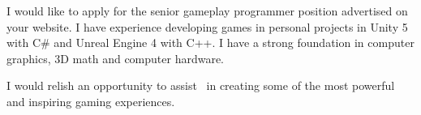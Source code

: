 I would like to apply for the senior gameplay programmer position advertised on your website.
I have experience developing games in personal projects in Unity 5 with C\# and Unreal Engine 4 with C++.
I have a strong foundation in computer graphics, 3D math and computer hardware.

I would relish an opportunity to assist \company~in creating some of the most powerful and inspiring gaming experiences. 